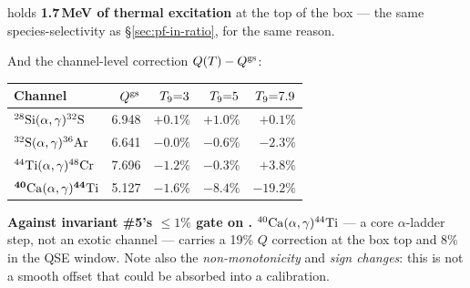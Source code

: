  holds \textbf{1.7\,MeV of thermal excitation} at the top of the box
--- the same species-selectivity as \S\ref{sec:pf-in-ratio}, for the same
reason.

And the channel-level correction $Q(T) - Q^{\rm gs}$:

\begin{center}
\begin{tabular}{@{}lrrrr@{}}
\toprule
\textbf{Channel} & \textbf{$Q^{\rm gs}$} & \textbf{$\Tn{=}3$}
  & \textbf{$\Tn{=}5$} & \textbf{$\Tn{=}7.9$} \\
\midrule
$\nuc{Si}{28}(\alpha,\gamma)\nuc{S}{32}$  & 6.948 & $+0.1\%$ & $+1.0\%$ & $+0.1\%$ \\
$\nuc{S}{32}(\alpha,\gamma)\nuc{Ar}{36}$  & 6.641 & $-0.0\%$ & $-0.6\%$ & $-2.3\%$ \\
$\nuc{Ti}{44}(\alpha,\gamma)\nuc{Cr}{48}$ & 7.696 & $-1.2\%$ & $-0.3\%$ & $+3.8\%$ \\
$\mathbf{\nuc{Ca}{40}(\alpha,\gamma)\nuc{Ti}{44}}$ & 5.127 & $-1.6\%$
  & $\mathbf{-8.4\%}$ & $\mathbf{-19.2\%}$ \\
\bottomrule
\end{tabular}
\end{center}

\textbf{Against invariant \#5's $\le1\%$ gate on \enuc.}
$\nuc{Ca}{40}(\alpha,\gamma)\nuc{Ti}{44}$ --- a core $\alpha$-ladder step, not
an exotic channel --- carries a 19\% $Q$ correction at the box top and 8\% in
the QSE window. Note also the \emph{non-monotonicity} and \emph{sign changes}:
this is not a smooth offset that could be absorbed into a calibration.

